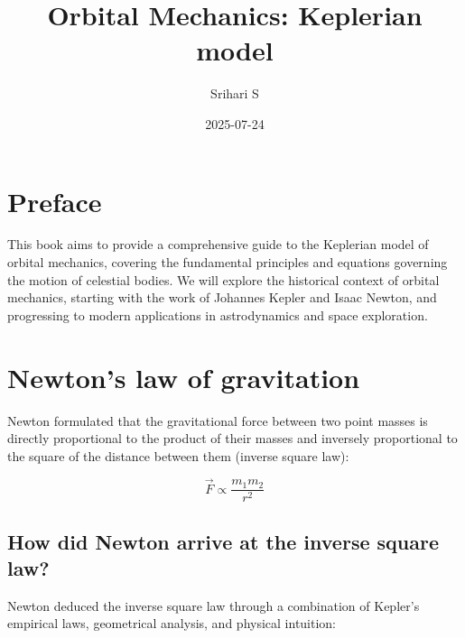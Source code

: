 \documentclass[
  letterpaper,
  DIV=11,
  numbers=noendperiod]{scrreprt}
\title{Orbital Mechanics: Keplerian model}
\author{Srihari S}
\date{2025-07-24}
\renewcommand*\contentsname{Table of contents}
\newcommand\contentsname{Table of contents}
\begin{document}
\maketitle

\renewcommand*\contentsname{Table of contents}
{
\hypersetup{linkcolor=}
\setcounter{tocdepth}{2}
\tableofcontents
}


\chapter*{Preface}\label{preface}


This book aims to provide a comprehensive guide to the Keplerian model
of orbital mechanics, covering the fundamental principles and equations
governing the motion of celestial bodies. We will explore the historical
context of orbital mechanics, starting with the work of Johannes Kepler
and Isaac Newton, and progressing to modern applications in
astrodynamics and space exploration.


\chapter{Newton's law of gravitation}\label{newtons-law-of-gravitation}

Newton formulated that the gravitational force between two point masses
is directly proportional to the product of their masses and inversely
proportional to the square of the distance between them (inverse square
law):

\[
\vec{F} \propto \frac{m_1 m_2}{r^2} 
\]

\section{How did Newton arrive at the inverse square
law?}\label{how-did-newton-arrive-at-the-inverse-square-law}

Newton deduced the inverse square law through a combination of Kepler's
empirical laws, geometrical analysis, and physical intuition:
\end{document}
